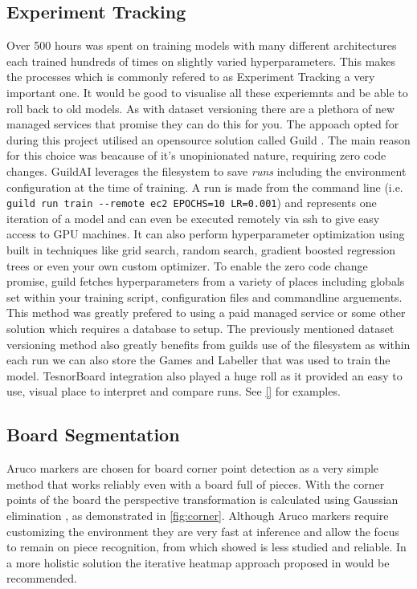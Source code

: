 \subsection{Experiment Tracking}
Over 500 hours was spent on training models with many different architectures each trained hundreds of times
on slightly varied hyperparameters.  This makes the processes which is commonly refered to as Experiment Tracking a very important one.
It would be good to visualise all these experiemnts and be able to roll back to old models.  As with dataset versioning there are a plethora of 
new managed services that promise they can do this for you.
The appoach opted for during this project utilised an opensource solution called Guild \cite{}.  The main reason for this choice was beacause of 
it's unopinionated nature, requiring zero code changes.  GuildAI leverages the filesystem to save \textit{runs} including the environment configuration
at the time of training.  A run is made from the command line (i.e. \verb|guild run train --remote ec2 EPOCHS=10 LR=0.001|) and
represents one iteration of a model and can even be executed remotely via ssh to give easy access to 
GPU machines.  It can also perform hyperparameter optimization using built in techniques like grid search, random search, gradient boosted regression trees 
or even your own custom optimizer.  To enable the zero code change promise, guild fetches hyperparameters from a variety of places including globals set within 
your training script, configuration files and commandline arguements.
This method was greatly prefered to using a paid managed service or some other solution which requires a database to setup.  
The previously mentioned dataset versioning method also greatly benefits from guilds use of the filesystem as within each run we can also store 
the Games and Labeller that was used to train the model. 
TesnorBoard integration also played a huge roll as it provided an easy to use, visual place to interpret and compare runs.  See \autoref{}
for examples.

\subsection{Board Segmentation}
Aruco markers are chosen for board corner point detection as a very simple method that works reliably even with a board full of pieces.
With the corner points of the board the perspective transformation is calculated using
Gaussian elimination \cite{gauss}, as demonstrated in \autoref{fig:corner}.
Although Aruco markers require customizing the environment they are very fast at 
inference and allow the focus to remain on piece recognition, from which
 showed is less studied and reliable.  In a more holistic solution the 
iterative heatmap approach proposed in \cite{heatmap} would be recommended.

